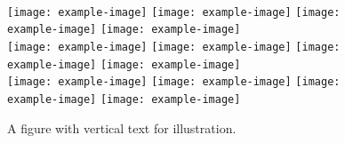 \begin{figure}[t] \centering
    \makebox[0.01\textwidth]{}
    \\
    \texttt{[image: example-image]}
    \texttt{[image: example-image]}
    \texttt{[image: example-image]}
    \texttt{[image: example-image]}
    \\
    \texttt{[image: example-image]}
    \texttt{[image: example-image]}
    \texttt{[image: example-image]}
    \texttt{[image: example-image]}
    \\
    \texttt{[image: example-image]}
    \texttt{[image: example-image]}
    \texttt{[image: example-image]}
    \texttt{[image: example-image]}
    \\
    \caption{A figure with vertical text for illustration.} 
    \label{fig:teaser}
\end{figure}

